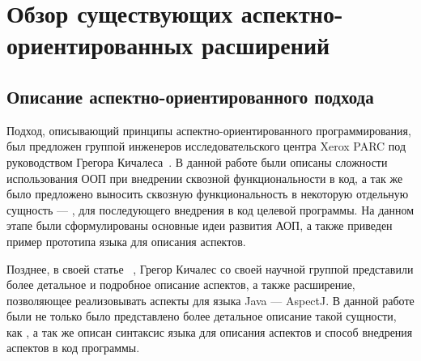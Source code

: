 \chapter{Обзор существующих аспектно-ориентированных расширений}

\section{Описание аспектно-ориентированного подхода}
Подход, описывающий принципы аспектно-ориентированного программирования, был
предложен группой инженеров исследовательского центра Xerox PARC под
руководством Грегора Кичалеса~\cite{kiczales_aop}.
В данной работе были описаны сложности использования ООП при внедрении сквозной
функциональности в код, а так же было предложено выносить сквозную
функциональность в некоторую отдельную сущность --- , для
последующего внедрения в код целевой программы.
На данном этапе были сформулированы основные идеи развития АОП, а также приведен
пример прототипа языка для описания аспектов.

Позднее, в своей статье ~\cite{kiczales_aspectj},
Грегор Кичалес со своей научной группой представили более детальное и подробное
описание аспектов, а также расширение, позволяющее реализовывать аспекты для
языка Java --- AspectJ.
В данной работе были не только было представлено более детальное описание такой
сущности, как , а так же описан синтаксис языка для описания
аспектов и способ внедрения аспектов в код программы.

